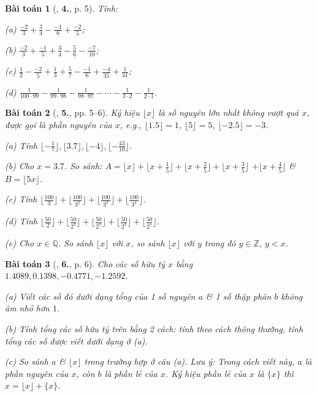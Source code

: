 \documentclass{article}
\numberwithin{equation}{section}
\newtheorem{baitoan}{Bài toán}[section]
\begin{document}
\begin{baitoan}[\cite{Binh_Toan_7_tap_1}, \textbf{4.}, p. 5]
	Tính:
	\begin{enumerate*}
		\item[(a)] $\frac{-2}{3} + \frac{3}{4} - \frac{-1}{6} + \frac{-2}{5}$;
		\item[(b)] $\frac{-2}{3} + \frac{-1}{5} + \frac{3}{4} - \frac{5}{6} - \frac{-7}{10}$;
		\item[(c)] $\frac{1}{2} - \frac{-2}{5} + \frac{1}{3} + \frac{5}{7} - \frac{-1}{6} + \frac{-4}{35} + \frac{1}{41}$;
		\item[(d)] $\frac{1}{100\cdot 99} - \frac{1}{99\cdot 98} - \frac{1}{98\cdot 97} - \cdots - \frac{1}{3\cdot 2} - \frac{1}{2\cdot 1}$.
	\end{enumerate*}
\end{baitoan}

\begin{baitoan}[\cite{Binh_Toan_7_tap_1}, \textbf{5.}, pp. 5--6]
	Ký hiệu $\lfloor x\rfloor$ là số nguyên lớn nhất không vượt quá $x$, được gọi là \emph{phần nguyên} của $x$, e.g., $\lfloor 1.5\rfloor = 1$, $\lfloor 5\rfloor = 5$, $\lfloor -2.5\rfloor = -3$.
	\begin{enumerate*}
		\item[(a)] Tính $\lfloor-\frac{1}{7}\rfloor,\lfloor 3.7\rfloor,\lfloor-4\rfloor,\lfloor-\frac{43}{10}\rfloor$.
		\item[(b)] Cho $x = 3.7$. So sánh: $A = \lfloor x\rfloor + \lfloor x + \frac{1}{5}\rfloor + \lfloor x + \frac{2}{5}\rfloor + \lfloor x + \frac{3}{5}\rfloor$ $+ \lfloor x + \frac{4}{5}\rfloor$ \& $B = \lfloor 5x\rfloor$.
		\item[(c)] Tính $ \lfloor\frac{100}{3}\rfloor + \lfloor\frac{100}{3^2}\rfloor + \lfloor\frac{100}{3^3}\rfloor + \lfloor\frac{100}{3^4}\rfloor$.
		\item[(d)] Tính $ \lfloor\frac{50}{2}\rfloor + \lfloor\frac{50}{2^2}\rfloor + \lfloor\frac{50}{2^3}\rfloor + \lfloor\frac{50}{2^4}\rfloor + \lfloor\frac{50}{2^5}\rfloor$.
		\item[(e)] Cho $x\in\mathbb{Q}$. So sánh $\lfloor x\rfloor$ với $x$, so sánh $\lfloor x\rfloor$ với $y$ trong đó $y\in\mathbb{Z}$, $y < x$.
	\end{enumerate*}
\end{baitoan}

\begin{baitoan}[\cite{Binh_Toan_7_tap_1}, \textbf{6.}, p. 6]
	Cho các số hữu tỷ $x$ bằng $1.4089, 0.1398, -0.4771, -1.2592$.
	\begin{enumerate*}
		\item[(a)] Viết các số đó dưới dạng tổng của 1 số nguyên $a$ \& 1 số thập phân $b$ không âm nhỏ hơn $1$.
		\item[(b)] Tính tổng các số hữu tỷ trên bằng 2 cách: tính theo cách thông thường, tính tổng các số được viết dưới dạng ở (a).
		\item[(c)] So sánh $a$ \& $\lfloor x\rfloor$ trong trường hợp ở câu (a). Lưu ý: Trong cách viết này, $a$ là \emph{phần nguyên} của $x$, còn $b$ là \emph{phần lẻ} của $x$. Ký hiệu phần lẻ của $x$ là $\{x\}$ thì $x = \lfloor x\rfloor + \{x\}$.
	\end{enumerate*}
\end{baitoan}
\end{document}
